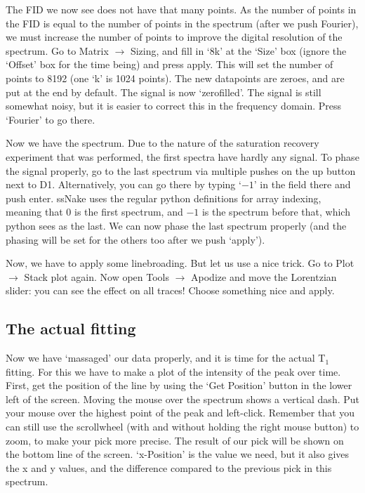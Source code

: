 \documentclass[11pt,a4paper]{article}
\begin{document}
The FID we now see does not have that many points. As the number of points in the FID is equal to the number of points in the spectrum (after we push Fourier), we must increase the number of points to improve the digital resolution of the spectrum. Go to Matrix $\rightarrow$ Sizing, and fill in `8k' at the `Size' box (ignore the `Offset' box for the time being) and press apply. This will set the number of points to 8192 (one `k' is 1024 points). The new datapoints are zeroes, and are put at the end by default. The signal is now `zerofilled'. The signal is still somewhat noisy, but it is easier to correct this in the frequency domain. Press `Fourier' to go there.

Now we have the spectrum. Due to the nature of the saturation recovery experiment that was performed, the first spectra have hardly any signal. To phase the signal properly, go to the last spectrum via multiple pushes on the up button next to D1. Alternatively, you can go there by typing `$-1$' in the field there and push enter. ssNake uses the regular python definitions for array indexing, meaning that 0 is the first spectrum, and $-1$ is the spectrum before that, which python sees as the last. We can now phase the last spectrum properly (and the phasing will be set for the others too after we push `apply').

Now, we have to apply some linebroading. But let us use a nice trick. Go to Plot $\rightarrow$ Stack plot again. Now open Tools $\rightarrow$ Apodize and move the Lorentzian slider: you can see the effect on all traces! Choose something nice and apply. 

\subsection{The actual fitting}
Now we have `massaged' our data properly, and it is time for the actual T$_1$ fitting. For this we have to make a plot of the intensity of the peak over time. First, get the position of the line
by using the `Get Position' button in the lower left of the screen. Moving the mouse over the spectrum shows a vertical dash. Put your mouse over the highest point of the peak and left-click. Remember that you can still use the scrollwheel (with and without holding the right mouse button) to zoom, to make your pick more precise. The result of our pick will be shown on the bottom line of the screen. `x-Position' is the value we need, but it also gives the x and y values, and the difference compared to the previous pick in this spectrum.
\end{document}
